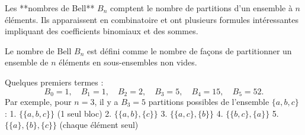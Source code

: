 \documentclass[12pt]{amsart}
\begin{document}
Les **nombres de Bell** \( B_n \) comptent le nombre de partitions d'un ensemble à \( n \) éléments. Ils apparaissent en combinatoire et ont plusieurs formules intéressantes impliquant des coefficients binomiaux et des sommes.  


Le nombre de Bell \( B_n \) est défini comme le nombre de façons de partitionner un ensemble de \( n \) éléments en sous-ensembles non vides.  

Quelques premiers termes :  
\[
B_0 = 1, \quad B_1 = 1, \quad B_2 = 2, \quad B_3 = 5, \quad B_4 = 15, \quad B_5 = 52.
\]
Par exemple, pour \( n=3 \), il y a \( B_3 = 5 \) partitions possibles de l’ensemble \(\{a, b, c\} \) :  
1. \( \{ \{a, b, c\} \} \) (1 seul bloc)  
2. \( \{ \{a, b\}, \{c\} \} \)  
3. \( \{ \{a, c\}, \{b\} \} \)  
4. \( \{ \{b, c\}, \{a\} \} \)  
5. \( \{ \{a\}, \{b\}, \{c\} \} \) (chaque élément seul)
\end{document}
